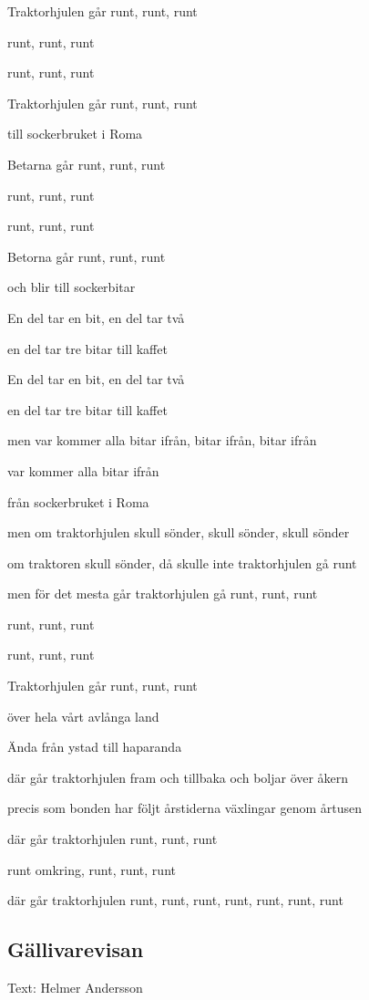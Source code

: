 Traktorhjulen går runt, runt, runt

runt, runt, runt

runt, runt, runt

Traktorhjulen går runt, runt, runt

till sockerbruket i Roma\bigskip 

Betarna går runt, runt, runt

runt, runt, runt

runt, runt, runt

Betorna går runt, runt, runt

och blir till sockerbitar\bigskip

En del tar en bit, en del tar två

en del tar tre bitar till kaffet

En del tar en bit, en del tar två

en del tar tre bitar till kaffet\bigskip

men var kommer alla bitar ifrån, bitar ifrån, bitar ifrån

var kommer alla bitar ifrån

från sockerbruket i Roma\bigskip

men om traktorhjulen skull sönder, skull sönder, skull sönder

om traktoren skull sönder, då skulle inte traktorhjulen gå runt\bigskip

men för det mesta går traktorhjulen gå runt, runt, runt

runt, runt, runt

runt, runt, runt

Traktorhjulen går runt, runt, runt

över hela vårt avlånga land\bigskip

Ända från ystad till haparanda

där går traktorhjulen fram och tillbaka och boljar över åkern

precis som bonden har följt årstiderna växlingar genom årtusen

där går traktorhjulen runt, runt, runt

runt omkring, runt, runt, runt

där går traktorhjulen runt, runt, runt, runt, runt, runt, runt

\subsection{\textbf{Gällivarevisan}}

Text: Helmer Andersson

